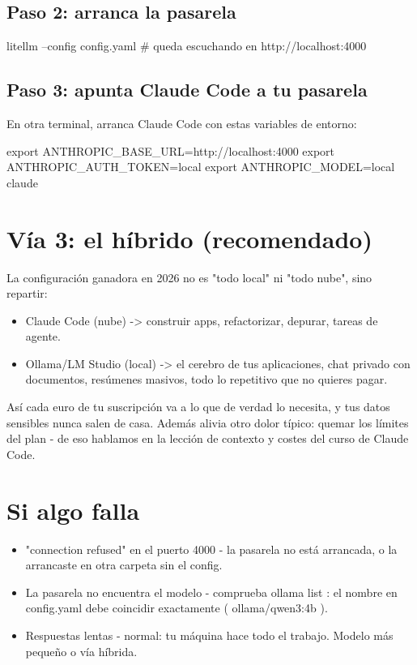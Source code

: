 \documentclass[11pt,a4paper]{book}
\begin{document}
\subsection{Paso 2: arranca la pasarela}
\begin{codebox}
litellm --config config.yaml
# queda escuchando en http://localhost:4000
\end{codebox}
\subsection{Paso 3: apunta Claude Code a tu pasarela}
En otra terminal, arranca Claude Code con estas variables de entorno:

\begin{codebox}
export ANTHROPIC_BASE_URL=http://localhost:4000
export ANTHROPIC_AUTH_TOKEN=local
export ANTHROPIC_MODEL=local
claude
\end{codebox}
\section{Vía 3: el híbrido (recomendado)}
La configuración ganadora en 2026 no es "todo local" ni "todo nube", sino repartir:

\begin{itemize}\item Claude Code (nube) -> construir apps, refactorizar, depurar, tareas de agente.\end{itemize}
\begin{itemize}\item Ollama/LM Studio (local) -> el cerebro de tus aplicaciones, chat privado con documentos, resúmenes masivos, todo lo repetitivo que no quieres pagar.\end{itemize}
Así cada euro de tu suscripción va a lo que de verdad lo necesita, y tus datos sensibles nunca salen de casa. Además alivia otro dolor típico: quemar los límites del plan - de eso hablamos en la lección de contexto y costes del curso de Claude Code.

\section{Si algo falla}
\begin{itemize}\item "connection refused" en el puerto 4000 - la pasarela no está arrancada, o la arrancaste en otra carpeta sin el config.\end{itemize}
\begin{itemize}\item La pasarela no encuentra el modelo - comprueba ollama list : el nombre en config.yaml debe coincidir exactamente ( ollama/qwen3:4b ).\end{itemize}
\begin{itemize}\item Respuestas lentas - normal: tu máquina hace todo el trabajo. Modelo más pequeño o vía híbrida.\end{itemize}
\end{document}

